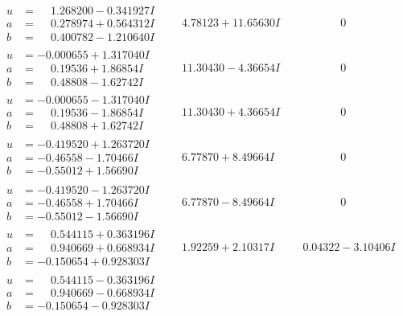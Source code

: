 \documentclass[1p]{elsarticle_modified}
\theoremstyle{definition}
\begin{document}
$$\begin{array}{c|c|c}
\begin{aligned}
u &= \phantom{-}1.268200 - 0.341927 I \\
a &= \phantom{-}0.278974 + 0.564312 I \\
b &= \phantom{-}0.400782 - 1.210640 I\end{aligned}
 & \phantom{-}4.78123 + 11.65630 I & \phantom{-0.000000 } 0 \\ \hline\begin{aligned}
u &= -0.000655 + 1.317040 I \\
a &= \phantom{-}0.19536 + 1.86854 I \\
b &= \phantom{-}0.48808 - 1.62742 I\end{aligned}
 & \phantom{-}11.30430 - 4.36654 I & \phantom{-0.000000 } 0 \\ \hline\begin{aligned}
u &= -0.000655 - 1.317040 I \\
a &= \phantom{-}0.19536 - 1.86854 I \\
b &= \phantom{-}0.48808 + 1.62742 I\end{aligned}
 & \phantom{-}11.30430 + 4.36654 I & \phantom{-0.000000 } 0 \\ \hline\begin{aligned}
u &= -0.419520 + 1.263720 I \\
a &= -0.46558 - 1.70466 I \\
b &= -0.55012 + 1.56690 I\end{aligned}
 & \phantom{-}6.77870 + 8.49664 I & \phantom{-0.000000 } 0 \\ \hline\begin{aligned}
u &= -0.419520 - 1.263720 I \\
a &= -0.46558 + 1.70466 I \\
b &= -0.55012 - 1.56690 I\end{aligned}
 & \phantom{-}6.77870 - 8.49664 I & \phantom{-0.000000 } 0 \\ \hline\begin{aligned}
u &= \phantom{-}0.544115 + 0.363196 I \\
a &= \phantom{-}0.940669 + 0.668934 I \\
b &= -0.150654 + 0.928303 I\end{aligned}
 & \phantom{-}1.92259 + 2.10317 I & \phantom{-}0.04322 - 3.10406 I \\ \hline\begin{aligned}
u &= \phantom{-}0.544115 - 0.363196 I \\
a &= \phantom{-}0.940669 - 0.668934 I \\
b &= -0.150654 - 0.928303 I\end{aligned}

\end{array}$$
\end{document}
